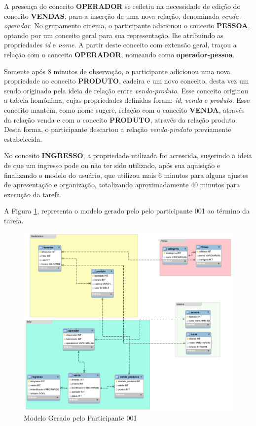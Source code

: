 A presença do conceito \textbf{OPERADOR} se refletiu na necessidade de edição do conceito \textbf{VENDAS}, para a inserção de uma nova relação, denominada \textit{venda-operador}. No grupamento cinema, o participante adicionou o conceito \textbf{PESSOA}, optando por um conceito geral para sua representação, lhe atribuindo as propriedades \textit{id} e \textit{nome}. A partir deste conceito com extensão geral, traçou a relação com o conceito \textbf{OPERADOR}, nomeando como \textbf{operador-pessoa}.

Somente após 8 minutos de observação, o participante adicionou uma nova propriedade ao conceito \textbf{PRODUTO}, cadeira e um novo conceito, desta vez um sendo originado pela ideia de relação entre \textit{venda-produto}. Esse conceito originou a tabela homônima, cujas propriedades definidas foram: \textit{id}, \textit{venda} e \textit{produto}. Esse conceito mantém, como nome sugere, relação com o conceito \textbf{VENDA}, através da relação venda e com o conceito \textbf{PRODUTO}, através da relação produto. Desta forma, o participante descartou a relação\textit{ venda-produto} previamente estabelecida.

No conceito \textbf{INGRESSO}, a propriedade utilizada foi acrescida, sugerindo a ideia de que um ingresso pode ou não ter sido utilizado, após sua aquisição e finalizando o modelo do usuário, que utilizou mais 6 minutos para alguns ajustes de apresentação e organização, totalizando aproximadamente 40 minutos para execução da tarefa.

A Figura \ref{fig:Modelo_000_Marlucio_Barbosa}, representa o modelo gerado pelo pelo participante 001 ao término da tarefa.

\begin{figure}[!ht]
    \centering
    \includegraphics[width=\textwidth]{imagens/Modelo_000_Marlucio_Barbosa.png}
    \caption{Modelo Gerado pelo Participante 001}
    \label{fig:Modelo_000_Marlucio_Barbosa}
\end{figure}

